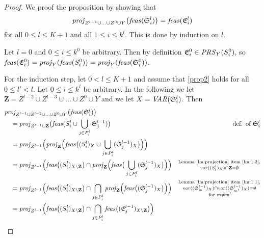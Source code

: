 \proptre*
\begin{proof}
We proof the proposition by showing that 
\begin{equation}\label{prop2}
\mathit{proj}_{Z^{l-1}\cup \ldots \cup Z^0\cup Y}\big(\mathit{feas}(\mathfrak{S}^l_i)\big)=\mathit{feas}(\mathfrak{E}^l_i)
\end{equation}
for all $0 \leq l \leq K+1$ and all $1\leq i \leq k^l$.
This is done by induction on $l$.

Let $l = 0$ and $0\leq i \leq k^0$ be arbitrary. Then by definition $\mathfrak{E}^0_i\in\mathit{PRS}_Y(S^0_i)$, so $\mathit{feas}(\mathfrak{E}^0_i)=\mathit{proj}_Y(\mathit{feas}(S^0_i))=\mathit{proj}_Y(\mathit{feas}(\mathfrak{S}^0_i))$.

For the induction step, let $0< l \leq K+1$ and assume that \eqref{prop2} holds for all $0\leq l'<l$.
Let $0\leq i\leq k^l$ be arbitrary. In the following we let $\mathbf{Z} = Z^{l-2} \cup Z^{l-3}\cup\ldots \cup Z^0\cup Y$ and we let $X=\mathit{VAR}(\mathfrak{S}^l_i)$. Then
\begin{align*}
&\proj_{Z^{l-1}\cup Z^{l-2}\cup\ldots\cup Z^0\cup Y}\big(\feas(\mathfrak{S}^l_i)\big)&\\ 
&\quad=\proj_{Z^{l-1}\cup\mathbf{Z}}\big(\feas(S^l_i\cup\bigcup_{j\in P^l_i}\mathfrak{S}^{l-1}_j)\big) & \text{def. of }\mathfrak{S}^l_i\\
&\quad= \proj_{Z^{l-1}}\Big(\proj_{\mathbf{Z}}\Big(\feas\big((S^l_i)_X\cup\bigcup_{j\in P^l_i}(\mathfrak{S}^{l-1}_j)_X\big)\Big)\Big)\\
&\quad=\proj_{Z^{l-1}}\Big(\feas\big((S^l_i)_{X\setminus\mathbf{Z}}\big)\cap\proj_{\mathbf{Z}}\Big(\feas\big(\bigcup_{j\in P^l_i}(\mathfrak{S}^{l-1}_j)_X\big)\Big)\Big)
&\substack{\text{Lemma~\ref{lm:projection} item \ref{lm:1.2}},\\\var((S^l_i)_X)\cap \mathbf{Z}= \emptyset}\\ 
&\quad= \proj_{Z^{l-1}}\Big(\feas\big((S^l_i)_{X\setminus\mathbf{Z}}\big)\cap\bigcap_{j\in P^l_i}\proj_{\mathbf{Z}}\Big(\feas\big((\mathfrak{S}^{l-1}_j)_X\big)\Big)\Big)
&\substack{\text{Lemma~\ref{lm:projection} item \ref{lm:1.1}},\\\var((\mathfrak{S}^{l-1}_{m})_X)\cap\var((\mathfrak{S}^{l-1}_{m'})_X)=\emptyset\\\text{ for } m\neq m'}\\
&\quad = \proj_{Z^{l-1}}\Big(\feas\big((S^l_i)_{X\setminus\mathbf{Z}}\big)\cap\bigcap_{j\in P^l_i}\feas\big((\mathfrak{E}^{l-1}_j)_{X\setminus \mathbf{Z}}\big)\Big)

\end{align*}
\end{proof}
